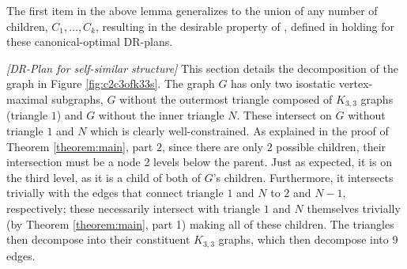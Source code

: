 \begin{remark}
The first item in the above lemma generalizes to the union of any number of
children, $C_1,\ldots,C_k$, resulting in the desirable property of ,
defined in \cite{hoffman2001decompositionI}
holding for these canonical-optimal DR-plans.
\end{remark}






\begin{figure*}\centering
\begin{subfigure}{.3\linewidth}\centering
    
    \caption{}\label{fig:c2c3ofk33s:a}
\end{subfigure}%
\begin{subfigure}{.7\linewidth}\centering
    
    \caption{}\label{fig:c2c3ofk33s:b}
\end{subfigure}

\caption{(\ref{fig:c2c3ofk33s:a}) A doublet ($C_2 \times C_3$) with each edge of the triangles replaced by a $K_{3,3}$. This pattern continues inwards for a total of $N$ triangles, indicated by the dashed lines. (\ref{fig:c2c3ofk33s:b}) Most of the DR-plan of this graph, omitting further decomposition of $K_{3,3}$ subgraphs into the separate 9 edges and of edges into the component nodes. $G\setminus\{a_i,b_i,c_i\}$ is shorthand for $G$ difference those nodes and all of the nodes in the corresponding $K_{3,3}$ subgraphs. The dashed lines indicated that this exact structure is repeated.}
\label{fig:c2c3ofk33s}
\end{figure*}

\myexample
\textsl{[DR-Plan for self-similar structure]}
This section details the decomposition of the graph in Figure \ref{fig:c2c3ofk33s}. The graph $G$ has only two isostatic vertex-maximal subgraphs, $G$ without the outermost triangle composed of $K_{3,3}$ graphs (triangle $1$) and $G$ without the inner triangle $N$. These intersect on $G$ without triangle $1$ and $N$ which is clearly well-constrained. As explained in the proof of Theorem \ref{theorem:main}, part 2, since there are only 2 possible children, their intersection must be a node 2 levels below the parent. Just as expected, it is on the third level, as it is a child of both of $G$'s children. Furthermore, it intersects trivially with the edges that connect triangle $1$ and $N$ to $2$ and $N-1$, respectively; these necessarily intersect with triangle $1$ and $N$ themselves trivially (by Theorem \ref{theorem:main}, part 1) making all of these children. The triangles then decompose into their constituent $K_{3,3}$ graphs, which then decompose into 9 edges.

